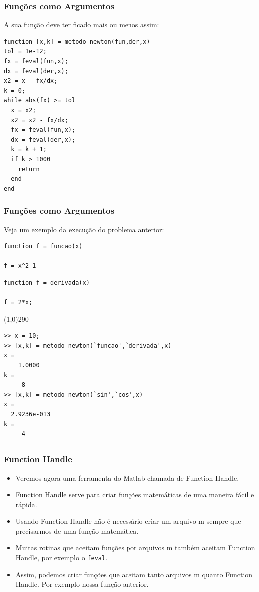 \documentclass{beamer}
\newcommand{\ssiz}{\scriptsize}
\newcommand{\delim}{\line(1,0){290}}
\begin{document}
\begin{frame}[fragile]
\frametitle {Fun\c{c}\~oes como Argumentos}
A sua fun\c{c}\~ao deve ter ficado mais ou menos assim:
\pause

{\ssiz
\begin{verbatim}
function [x,k] = metodo_newton(fun,der,x)
tol = 1e-12;
fx = feval(fun,x);
dx = feval(der,x);
x2 = x - fx/dx;
k = 0;
while abs(fx) >= tol
  x = x2;
  x2 = x2 - fx/dx;
  fx = feval(fun,x);
  dx = feval(der,x);
  k = k + 1;
  if k > 1000
    return
  end
end\end{verbatim}
}

\end{frame}

\begin{frame}[fragile]
\frametitle{Fun\c{c}\~oes como Argumentos}

Veja um exemplo da execu\c{c}\~ao do problema anterior:

{\ssiz
\begin{multicols}{2}
\begin{verbatim}
function f = funcao(x)

f = x^2-1
\end{verbatim}
\begin{verbatim}
function f = derivada(x)

f = 2*x;
\end{verbatim}
\end{multicols}

\pause
\delim

\begin{verbatim}
>> x = 10;
>> [x,k] = metodo_newton(`funcao',`derivada',x)
x =
    1.0000
k =
     8
>> [x,k] = metodo_newton(`sin',`cos',x)
x =
  2.9236e-013
k =
     4
\end{verbatim}
}
\end{frame}

\subsection[Function Handle]{}

\begin{frame}
\frametitle{Function Handle}

\begin{itemize}
 \item<1-> Veremos agora uma ferramenta do Matlab chamada de Function Handle.
 \item<2-> Function Handle serve para criar fun\c{c}\~oes matem\'aticas de uma maneira f\'acil e r\'apida.
 \item<3-> Usando Function Handle n\~ao \'e necess\'ario criar um arquivo m sempre que precisarmos de uma fun\c{c}\~ao matem\'atica.
 \item<4-> Muitas rotinas que aceitam fun\c{c}\~oes por arquivos m tamb\'em aceitam Function Handle, por exemplo o {\tt feval}.
 \item<5-> Assim, podemos criar fun\c{c}\~oes que aceitam tanto arquivos m quanto Function Handle. Por exemplo nossa fun\c{c}\~ao anterior.
\end{itemize}
\end{frame}
\end{document}
